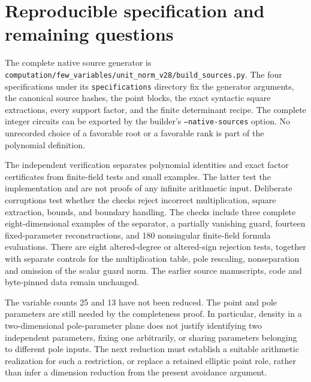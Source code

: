 \documentclass[11pt,a4paper]{article}
\theoremstyle{remark}\newtheorem{remark}[theorem]{Remark}
\begin{document}
\section{Reproducible specification and remaining questions}
The complete native source generator is
\nolinkurl{computation/few_variables/unit_norm_v28/build_sources.py}.
The four specifications under its \texttt{specifications} directory
fix the generator arguments, the canonical source hashes, the point
blocks, the exact syntactic square extractions, every support factor,
and the finite determinant recipe. The complete integer circuits can
be exported by the builder's \texttt{--native-sources} option. No
unrecorded choice of a favorable root or a favorable rank is part of
the polynomial definition.

The independent verification separates polynomial identities and
exact factor certificates from finite-field tests and small examples.
The latter test the implementation and are not proofs of any infinite
arithmetic input. Deliberate corruptions test whether the checks reject
incorrect multiplication, square extraction, bounds, and boundary handling.
The checks include three complete eight-dimensional examples of the
separator, a partially vanishing guard, fourteen fixed-parameter
reconstructions, and 180 nonsingular finite-field formula evaluations.
There are eight altered-degree or altered-sign rejection tests, together
with separate controls for the multiplication table, pole rescaling,
nonseparation and omission of the scalar guard norm.
The earlier source manuscripts, code and byte-pinned data remain unchanged.

The variable counts 25 and 13 have not been reduced. The point and pole
parameters are still needed by the completeness proof. In particular,
density in a two-dimensional pole-parameter plane does not justify
identifying two independent parameters, fixing one arbitrarily, or
sharing parameters belonging to different pole inputs. The next reduction
must establish a suitable arithmetic realization for such a restriction,
or replace a retained elliptic point role, rather than infer a dimension
reduction from the present avoidance argument.
\end{document}
